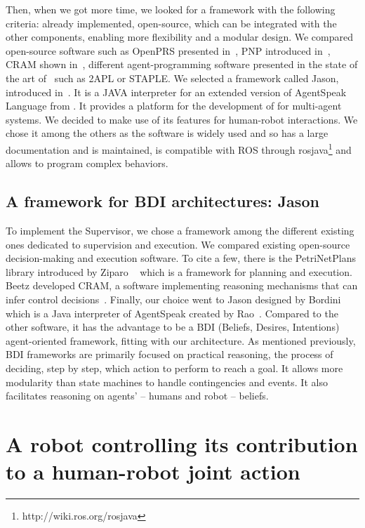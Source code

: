\documentclass[a4paper,11pt,twoside]{StyleThese}
\begin{document}
Then, when we got more time, we looked for a framework with the following criteria: already implemented, open-source, which can be integrated with the other components, enabling more flexibility and a modular design. We compared open-source software such as OpenPRS presented in~\cite{ingrand2007}, PNP introduced in~\cite{ziparo2011}, CRAM shown in~\cite{beetz2010}, different agent-programming software presented in the state of the art of~\cite{hubner2009} such as 2APL or STAPLE. We selected a framework called Jason, introduced in~\cite{Bordini:2007:PMS:1197104}. It is a JAVA interpreter for an extended version of AgentSpeak Language from \cite{rao1996}. It provides a platform for the development of for multi-agent systems. We decided to make use of its features for human-robot interactions. We chose it among the others as the software is widely used and so has a large documentation and is maintained, is compatible with ROS through rosjava\footnote{http://wiki.ros.org/rosjava} and allows to program complex behaviors. 

\subsection{A framework for BDI architectures: Jason}
To implement the Supervisor, we chose a framework among the different existing ones dedicated to supervision and execution. We compared existing open-source decision-making and execution software. To cite a few, there is the PetriNetPlans library introduced by Ziparo \etal~\cite{ziparo_2011_petri} which is a framework for planning and execution. Beetz \etal{} developed CRAM, a software implementing reasoning mechanisms that can infer control decisions~\cite{beetz_2010_cram}. Finally, our choice went to Jason designed by Bordini \etal~\cite{bordini_2007_jason} which is a Java interpreter of AgentSpeak created by Rao~\cite{rao_1996_agentspeak}. Compared to the other software, it has the advantage to be a BDI (Beliefs, Desires, Intentions) agent-oriented framework, fitting with our architecture. As mentioned previously, BDI frameworks are primarily focused on practical reasoning, \ie the process of deciding, step by step, which action to perform to reach a goal. It allows more modularity than state machines to handle contingencies and events. It also facilitates reasoning on agents' -- humans and robot -- beliefs.


\section{A robot controlling its contribution to a human-robot joint action}
\end{document}
